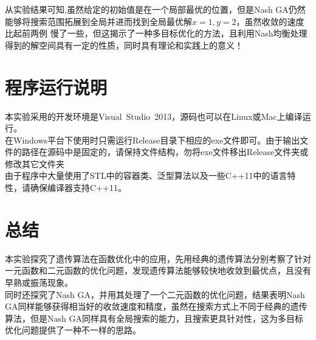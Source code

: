 \documentclass[UTF8]{ctexart}
\begin{document}
\indent 从实验结果可知,虽然给定的初始值是在一个局部最优的位置，但是Nash GA仍然能够将搜索范围拓展到全局并进而找到全局最优解$x=1,y=2$，虽然收敛的速度比起前两例
慢了一些，但这揭示了一种多目标优化的方法，且利用Nash均衡处理得到的解空间具有一定的性质，同时具有理论和实践上的意义！

\section{程序运行说明}
本实验采用的开发环境是Visual\ Studio\ 2013，源码也可以在Linux或Mac上编译运行。\\
\indent 在Windows平台下使用时只需运行Release目录下相应的exe文件即可。由于输出文件的路径在源码中是固定的，请保持文件结构，勿将exe文件移出Release文件夹或修改其它文件夹\\
\indent 由于程序中大量使用了STL中的容器类、泛型算法以及一些C++11中的语言特性，请确保编译器支持C++11。\\

\section{总结}
本实验探究了遗传算法在函数优化中的应用，先用经典的遗传算法分别考察了针对一元函数和二元函数的优化问题，发现遗传算法能够较快地收敛到最优点，且没有早熟或振荡现象。\\
\indent 同时还探究了Nash GA，并用其处理了一个二元函数的优化问题，结果表明Nash GA同样能够获得相当好的收敛速度和精度，虽然在搜索方式上不同于经典的遗传算法，但是Nash GA同样具有全局搜索的能力，且搜索更具针对性，这为多目标优化问题提供了一种不一样的思路。

\clearpage


\end{document}
